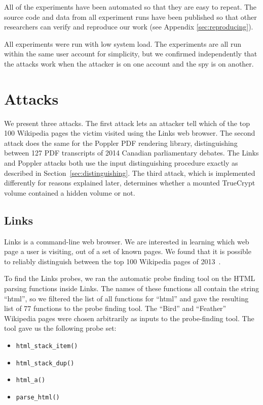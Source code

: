 \documentclass[letterpaper,twocolumn,10pt]{article}
\begin{document}
All of the experiments have been automated so that they are easy to repeat. The
source code and data from all experiment runs have been published so that other
researchers can verify and reproduce our work (see Appendix
\ref{sec:reproducing}).

All experiments were run with low system load. The experiments are all run
within the same user account for simplicity, but we confirmed independently that
the attacks work when the attacker is on one account and the spy is on another.

\section{Attacks}
\label{sec:results}

We present three attacks. The first attack lets an attacker tell which of the
top 100 Wikipedia pages the victim visited using the Links web browser. The
second attack does the same for the Poppler PDF rendering library,
distinguishing between 127 PDF transcripts of 2014 Canadian parliamentary
debates. The Links and Poppler attacks both use the input distinguishing
procedure exactly as described in Section~\ref{sec:distinguishing}. The third
attack, which is implemented differently for reasons explained later, determines
whether a mounted TrueCrypt volume contained a hidden volume or not.

\subsection{Links}

Links is a command-line web browser. We are interested in learning which web
page a user is visiting, out of a set of known pages. We found that it is
possible to reliably distinguish between the top 100 Wikipedia pages of
2013~\cite{wikitop2013}.

To find the Links probes, we ran the automatic probe finding tool on the HTML
parsing functions inside Links. The names of these functions all contain the
string ``html'', so we filtered the list of all functions for ``html'' and gave
the resulting list of 77 functions to the probe finding tool.
The ``Bird'' and
``Feather'' Wikipedia pages were chosen arbitrarily as inputs to
the probe-finding tool. The tool gave us the following probe set:

\begin{itemize}
\setlength{\itemsep}{0pt}
    \item \texttt{html\_stack\_item()}
    \item \texttt{html\_stack\_dup()}
    \item \texttt{html\_a()}
    \item \texttt{parse\_html()}
\end{itemize}
\end{document}
